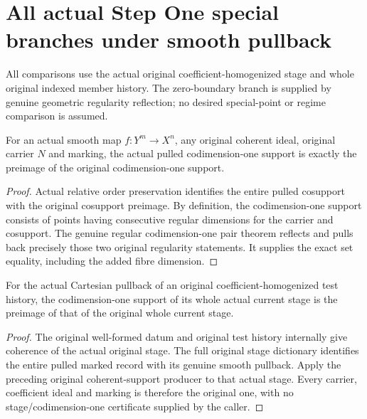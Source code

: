 \section{All actual Step One special branches under smooth pullback}

All comparisons use the actual original coefficient-homogenized stage and
whole original indexed member history.  The zero-boundary branch is supplied
by genuine geometric regularity reflection; no desired special-point or
regime comparison is assumed.

\begin{lemma}
\label{hir:smooth-all-branches-codimension-one-support}
\leanok
{}
For an actual smooth map $f:Y^m\to X^n$, any original coherent ideal,
original carrier $N$ and marking, the actual pulled codimension-one support
is exactly the preimage of the original codimension-one support.
\end{lemma}
\begin{proof}
Actual relative order preservation identifies the entire pulled cosupport
with the original cosupport preimage.  By definition, the codimension-one
support consists of points having consecutive regular dimensions for the
carrier and cosupport.  The genuine regular codimension-one pair theorem
reflects and pulls back precisely those two original regularity statements.
It supplies the exact set equality, including the added fibre dimension.
\end{proof}

\begin{lemma}
\label{hir:smooth-all-branches-original-stage-codimension-one}
\leanok
{}
For the actual Cartesian pullback of an original coefficient-homogenized
test history, the codimension-one support of its whole actual current
stage is the preimage of that of the original whole current stage.
\end{lemma}
\begin{proof}
The original well-formed datum and original test history internally give
coherence of the actual original stage.  The full original stage dictionary
identifies the entire pulled marked record with its genuine smooth pullback.
Apply the preceding original coherent-support producer to that actual stage.
Every carrier, coefficient ideal and marking is therefore the original one,
with no stage/codimension-one certificate supplied by the caller.
\end{proof}

